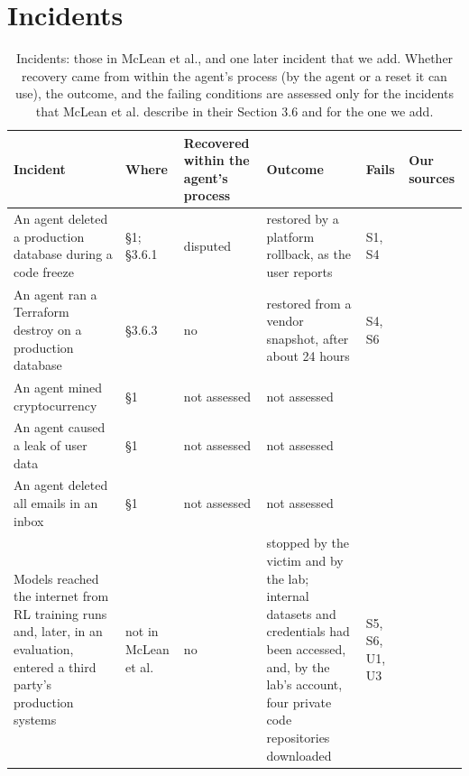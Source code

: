 \documentclass{article}
\begin{document}
\hypertarget{app:incidents}{%
\section{Incidents}\label{app:incidents}}

\begin{table}[!htb]
\centering\small\setlength{\tabcolsep}{3pt}
\caption{Incidents: those in McLean et al., and one later incident that we add. Whether recovery came from within the agent's process (by the agent or a reset it can use), the outcome, and the failing conditions are assessed only for the incidents that McLean et al. describe in their Section 3.6 and for the one we add.}\label{tab:incidents}
\begin{tabularx}{\textwidth}{@{}>{\raggedright\arraybackslash}X>{\raggedright\arraybackslash}X>{\raggedright\arraybackslash}X>{\raggedright\arraybackslash}Xll@{}}
\toprule
Incident & Where & Recovered within the agent's process & Outcome & Fails & Our sources \\
\midrule
An agent deleted a production database during a code freeze & §1; §3.6.1 & disputed & restored by a platform rollback, as the user reports & S1, S4 & \citep{sharwood2025} \\
An agent ran a Terraform destroy on a production database & §3.6.3 & no & restored from a vendor snapshot, after about 24 hours & S4, S6 & \citep{grigorev2026} \\
An agent mined cryptocurrency & §1 & not assessed & not assessed &  &  \\
An agent caused a leak of user data & §1 & not assessed & not assessed &  &  \\
An agent deleted all emails in an inbox & §1 & not assessed & not assessed &  &  \\
Models reached the internet from RL training runs and, later, in an evaluation, entered a third party's production systems & not in McLean et al. & no & stopped by the victim and by the lab; internal datasets and credentials had been accessed, and, by the lab's account, four private code repositories downloaded & S5, S6, U1, U3 & \citep{openai2026, openai2026b, openai2026c, huggingface2026a, huggingface2026b, metr2026} \\
\bottomrule
\end{tabularx}
\end{table}
\end{document}
